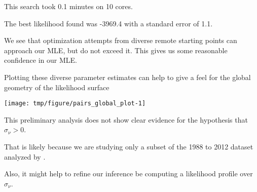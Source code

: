 \begin{frame}[fragile]

\bi

\item This search took  0.1 minutes on 10 cores.

\item The best likelihood found was -3969.4 with a standard error of 1.1. 

\item We see that optimization attempts from diverse remote starting points can approach our MLE, but do not exceed it. This gives us some reasonable confidence in our MLE. 

\item Plotting these diverse parameter estimates can help to give a feel for the global geometry of the likelihood surface 

\ei

\end{frame}

\begin{frame}[fragile]

\begin{knitrout}\small
{}\color{fgcolor}\begin{kframe}
\begin{alltt}
\hldef{(}\hlopt{~}\hlopt{+}\hlopt{+}\hlopt{+}\hlopt{+}\hlopt{+}
  \hldef{=}\hlopt{>}\hlopt{-}\hldef{))}
\end{alltt}
\end{kframe}
\end{knitrout}

\vspace{-4mm}

\begin{knitrout}\small
{}\color{fgcolor}

{\centering \texttt{[image: tmp/figure/pairs\_global\_plot-1]} 

}


\end{knitrout}
\end{frame}

\begin{frame}[fragile]

\bi

\item This preliminary analysis does not show clear evidence for the hypothesis that $\sigma_\nu > 0$. 

\item That is likely because we are studying only a subset of the 1988 to 2012 dataset analyzed by \citet{breto14}. 

\item Also, it might help to refine our inference be computing a likelihood profile over $\sigma_\nu$.

\ei

\end{frame}

